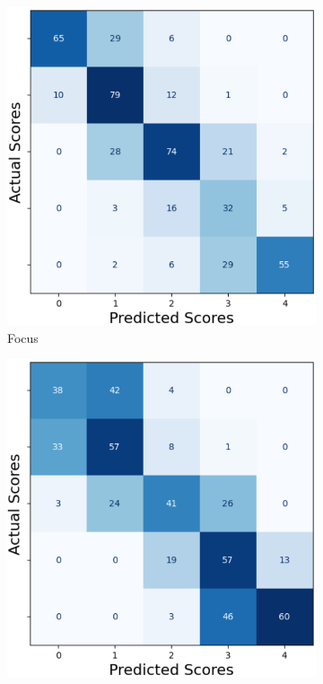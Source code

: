 \begin{figure}[ht]
    \begin{subfigure}[b]{0.24\textwidth}
        \includegraphics[width=\textwidth]{img/cm/foc.png}
        \caption{Focus}
        \label{fig:cm_foc}
    \end{subfigure}
    \hfill
    \begin{subfigure}[b]{0.24\textwidth}
        \includegraphics[width=\textwidth]{img/cm/cc.png}

\end{subfigure}
\end{figure}
